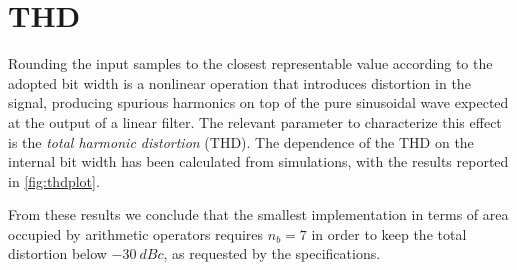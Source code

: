 \section{THD}
\label{sec:THD}
Rounding the input samples to the closest representable value according to the adopted bit width is a nonlinear operation that introduces distortion in the signal, producing spurious harmonics on top of the pure sinusoidal wave expected at the output of a linear filter. The relevant parameter to characterize this effect is the \textit{total harmonic distortion} (THD). The dependence of the THD on the internal bit width has been calculated from simulations, with the results reported in \autoref{fig:thdplot}.


From these results we conclude that the smallest implementation in terms of area occupied by arithmetic operators requires $n_b=7$ in order to keep the total distortion below $\SI{-30}{dBc}$, as requested by the specifications.
